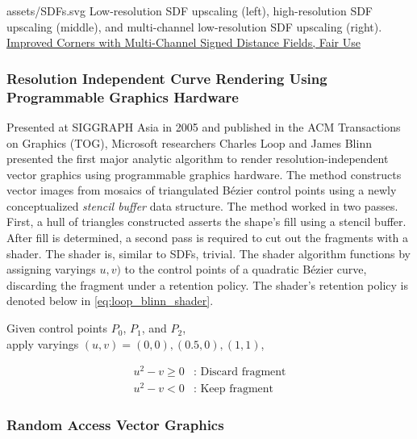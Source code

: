 \widesvg
{assets/SDFs.svg}
{Low-resolution SDF upscaling (left), high-resolution SDF upscaling (middle), and multi-channel low-resolution SDF upscaling (right).\label{fig:sdf}}
{\href{https://doi.org/10.1111/cgf.13265}{Improved Corners with Multi-Channel Signed Distance Fields, Fair Use}}
\medskip

\subsubsection{Resolution Independent Curve Rendering Using Programmable Graphics Hardware}\cite{Loop05}\label{sec:LoopBlinn}

Presented at SIGGRAPH Asia in 2005 and published in the ACM Transactions on Graphics (TOG), Microsoft researchers Charles Loop and James Blinn presented the first major analytic algorithm to render resolution-independent vector graphics using programmable graphics hardware. The method constructs vector images from mosaics of triangulated Bézier control points using a newly conceptualized \emph{stencil buffer} data structure. The method worked in two passes. First, a hull of triangles constructed asserts the shape's fill using a stencil buffer. After fill is determined, a second pass is required to cut out the fragments with a shader. The shader is, similar to SDFs, trivial. The shader algorithm functions by assigning varyings \(u, v)\) to the control points of a quadratic Bézier curve, discarding the fragment under a retention policy. The shader's retention policy is denoted below in \cref{eq:loop_blinn_shader}.\medskip

\begin{center}
Given control points \(P_0\), \(P_1\), and \(P_2\),\\
apply varyings \((u, v) = (0, 0), (0.5, 0), (1, 1)\),
\end{center}
\begin{equation}\label{eq:loop_blinn_shader}
    \begin{split}
        u^2 - v \ge 0 & \text{: Discard fragment} \\
        u^2 - v < 0 & \text{: Keep fragment}
    \end{split}
\end{equation}
\medskip


\subsubsection{Random Access Vector Graphics}\cite{Nehab08}\label{sec:RAVG}

